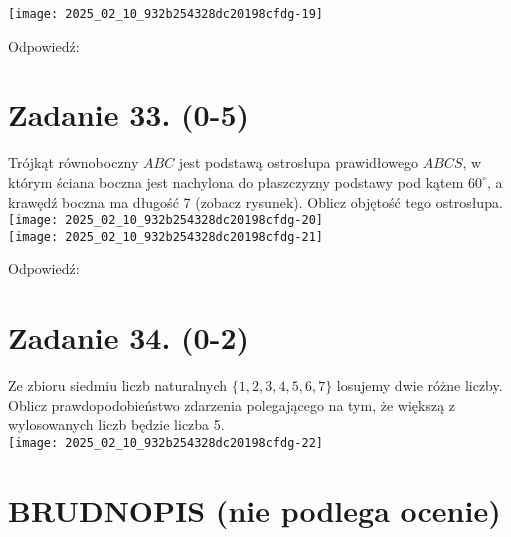 \documentclass[10pt]{article}
\begin{document}
\begin{center}
\texttt{[image: 2025\_02\_10\_932b254328dc20198cfdg-19]}
\end{center}

Odpowiedź:

\section*{Zadanie 33. (0-5)}
Trójkąt równoboczny \(A B C\) jest podstawą ostrosłupa prawidłowego \(A B C S\), w którym ściana boczna jest nachylona do płaszczyzny podstawy pod kątem \(60^{\circ}\), a krawędź boczna ma długość 7 (zobacz rysunek). Oblicz objętość tego ostrosłupa.\\
\texttt{[image: 2025\_02\_10\_932b254328dc20198cfdg-20]}\\
\texttt{[image: 2025\_02\_10\_932b254328dc20198cfdg-21]}

Odpowiedź:

\section*{Zadanie 34. (0-2)}
Ze zbioru siedmiu liczb naturalnych \(\{1,2,3,4,5,6,7\}\) losujemy dwie różne liczby. Oblicz prawdopodobieństwo zdarzenia polegającego na tym, że większą z wylosowanych liczb będzie liczba 5.\\
\texttt{[image: 2025\_02\_10\_932b254328dc20198cfdg-22]}

\section*{BRUDNOPIS (nie podlega ocenie)}
\end{document}
